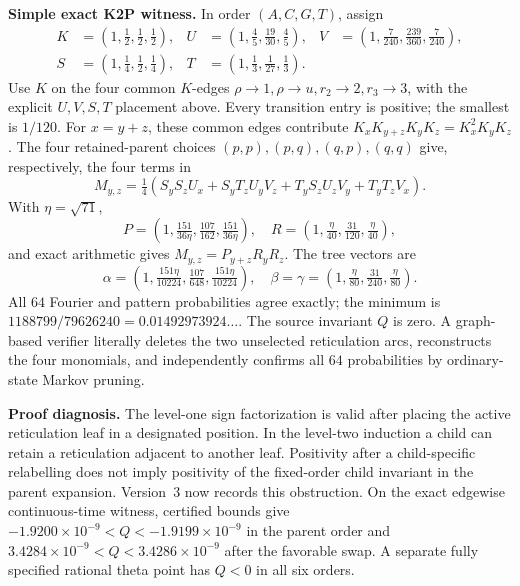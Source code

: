 \documentclass[10pt]{article}
\begin{document}
\textbf{Simple exact K2P witness.} In order $(A,C,G,T)$, assign
\[
\begin{aligned}
K&=(1,\tfrac12,\tfrac12,\tfrac12),&U&=(1,\tfrac45,\tfrac{19}{30},\tfrac45),&V&=(1,\tfrac7{240},\tfrac{239}{360},\tfrac7{240}),\\
S&=(1,\tfrac14,\tfrac12,\tfrac14),&T&=(1,\tfrac13,\tfrac1{27},\tfrac13).
\end{aligned}
\]
Use $K$ on the four common $K$-edges $\rho\to1,\rho\to u,r_2\to2,r_3\to3$, with the explicit $U,V,S,T$ placement above. Every transition entry is positive; the smallest is $1/120$. For $x=y+z$, these common edges contribute $K_xK_{y+z}K_yK_z=K_x^2K_yK_z$. The four retained-parent choices $(p,p),(p,q),(q,p),(q,q)$ give, respectively, the four terms in
\[
M_{y,z}=\tfrac14(S_yS_zU_x+S_yT_zU_yV_z+T_yS_zU_zV_y+T_yT_zV_x).
\]
With $\eta=\sqrt{71}$,
\[
P=(1,\tfrac{151}{36\eta},\tfrac{107}{162},\tfrac{151}{36\eta}),\quad R=(1,\tfrac{\eta}{40},\tfrac{31}{120},\tfrac{\eta}{40}),
\]
and exact arithmetic gives $M_{y,z}=P_{y+z}R_yR_z$. The tree vectors are
\[
\alpha=(1,\tfrac{151\eta}{10224},\tfrac{107}{648},\tfrac{151\eta}{10224}),\quad
\beta=\gamma=(1,\tfrac{\eta}{80},\tfrac{31}{240},\tfrac{\eta}{80}).
\]
All $64$ Fourier and pattern probabilities agree exactly; the minimum is $1188799/79626240=0.01492973924\ldots$. The source invariant $Q$ is zero. A graph-based verifier literally deletes the two unselected reticulation arcs, reconstructs the four monomials, and independently confirms all $64$ probabilities by ordinary-state Markov pruning.

\textbf{Proof diagnosis.} The level-one sign factorization is valid after placing the active reticulation leaf in a designated position. In the level-two induction a child can retain a reticulation adjacent to another leaf. Positivity after a child-specific relabelling does not imply positivity of the fixed-order child invariant in the parent expansion. Version~3 now records this obstruction. On the exact edgewise continuous-time witness, certified bounds give $-1.9200\times10^{-9}<Q<-1.9199\times10^{-9}$ in the parent order and $3.4284\times10^{-9}<Q<3.4286\times10^{-9}$ after the favorable swap. A separate fully specified rational theta point has $Q<0$ in all six orders.
\end{document}
